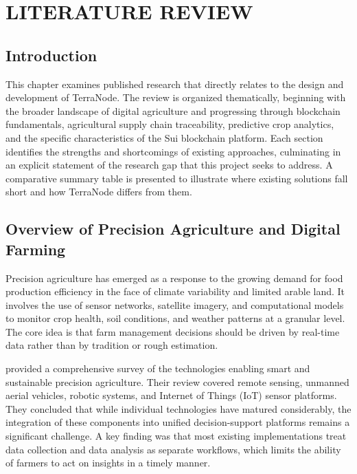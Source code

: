 \chapter{LITERATURE REVIEW}

\section{Introduction}

This chapter examines published research that directly relates to the design and development of TerraNode. The review is organized thematically, beginning with the broader landscape of digital agriculture and progressing through blockchain fundamentals, agricultural supply chain traceability, predictive crop analytics, and the specific characteristics of the Sui blockchain platform. Each section identifies the strengths and shortcomings of existing approaches, culminating in an explicit statement of the research gap that this project seeks to address. A comparative summary table is presented to illustrate where existing solutions fall short and how TerraNode differs from them.

\section{Overview of Precision Agriculture and Digital Farming}

Precision agriculture has emerged as a response to the growing demand for food production efficiency in the face of climate variability and limited arable land. It involves the use of sensor networks, satellite imagery, and computational models to monitor crop health, soil conditions, and weather patterns at a granular level. The core idea is that farm management decisions should be driven by real-time data rather than by tradition or rough estimation.

\textcite{padhiary2025emerging} provided a comprehensive survey of the technologies enabling smart and sustainable precision agriculture. Their review covered remote sensing, unmanned aerial vehicles, robotic systems, and Internet of Things (IoT) sensor platforms. They concluded that while individual technologies have matured considerably, the integration of these components into unified decision-support platforms remains a significant challenge. A key finding was that most existing implementations treat data collection and data analysis as separate workflows, which limits the ability of farmers to act on insights in a timely manner.

